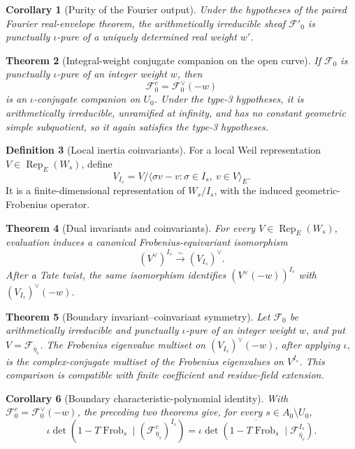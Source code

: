 \documentclass[10pt]{article}
\newtheorem{theorem}{Theorem}[section]
\newtheorem{corollary}[theorem]{Corollary}
\theoremstyle{definition}
\newtheorem{definition}[theorem]{Definition}
\newcommand{\Rep}{\operatorname{Rep}}
\newcommand{\Frob}{\operatorname{Frob}}
\begin{document}
\begin{corollary}[Purity of the Fourier output]
Under the hypotheses of the paired Fourier real-envelope theorem, the
arithmetically irreducible sheaf \(\mathcal F'_0\) is punctually
\(\iota\)-pure of a uniquely determined real weight \(w'\).
\end{corollary}

\begin{theorem}[Integral-weight conjugate companion on the open curve]
If \(\mathcal F_0\) is punctually \(\iota\)-pure of an integer weight
\(w\), then
\[
                     \mathcal F_0^c=\mathcal F_0^\vee(-w)
\]
is an \(\iota\)-conjugate companion on \(U_0\).  Under the type-3
hypotheses, it is arithmetically irreducible, unramified at infinity, and
has no constant geometric simple subquotient, so it again satisfies the
type-3 hypotheses.
\end{theorem}

\begin{definition}[Local inertia coinvariants]
For a local Weil representation \(V\in\Rep_E(W_s)\), define
\[
 V_{I_s}=V/\langle\sigma v-v:\sigma\in I_s,\ v\in V\rangle_E.
\]
It is a finite-dimensional representation of \(W_s/I_s\), with the
induced geometric-Frobenius operator.
\end{definition}

\begin{theorem}[Dual invariants and coinvariants]
For every \(V\in\Rep_E(W_s)\), evaluation induces a canonical
Frobenius-equivariant isomorphism
\[
 (V^\vee)^{I_s}\xrightarrow{\sim}(V_{I_s})^\vee.
\]
After a Tate twist, the same isomorphism identifies
\((V^\vee(-w))^{I_s}\) with \((V_{I_s})^\vee(-w)\).
\end{theorem}

\begin{theorem}[Boundary invariant--coinvariant symmetry]
Let \(\mathcal F_0\) be arithmetically irreducible and punctually
\(\iota\)-pure of an integer weight \(w\), and put
\(V=\mathcal F_{\bar\eta_s}\).  The Frobenius eigenvalue multiset on
\((V_{I_s})^\vee(-w)\), after applying \(\iota\), is the complex-conjugate
multiset of the Frobenius eigenvalues on \(V^{I_s}\).  This comparison is
compatible with finite coefficient and residue-field extension.
\end{theorem}

\begin{corollary}[Boundary characteristic-polynomial identity]
With \(\mathcal F_0^c=\mathcal F_0^\vee(-w)\), the preceding two theorems
give, for every \(s\in A_0\setminus U_0\),
\[
 \iota\det\!\left(1-T\Frob_s\mid
       (\mathcal F^c_{\bar\eta_s})^{I_s}\right)
 =
 \overline{\iota\det\!\left(1-T\Frob_s\mid
       \mathcal F_{\bar\eta_s}^{I_s}\right)}.
\]
\end{corollary}
\end{document}
